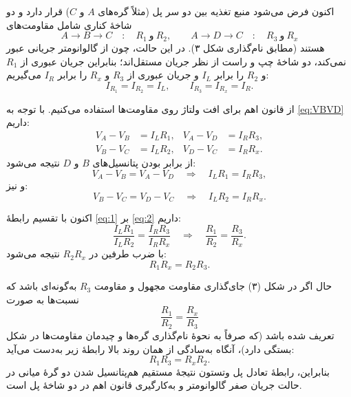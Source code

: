 \documentclass[a4paper, 11pt]{article}
\begin{document}
اکنون فرض می‌شود منبع تغذیه بین دو سر پل (مثلاً گره‌های $A$ و $C$) قرار دارد و دو شاخهٔ کناری شامل مقاومت‌های
\[
A \to B \to C \quad : \quad R_1 \ \text{و}\ R_2,
\qquad
A \to D \to C \quad : \quad R_3 \ \text{و}\ R_x
\]
هستند (مطابق نام‌گذاری شکل ۳). در این حالت، چون از گالوانومتر جریانی عبور نمی‌کند، دو شاخهٔ چپ و راست از نظر جریان مستقل‌اند؛ بنابراین جریان عبوری از $R_1$ و $R_2$ را برابر $I_L$ و جریان عبوری از $R_3$ و $R_x$ را برابر $I_R$ می‌گیریم:
\begin{equation}
I_{R_1}=I_{R_2}=I_L,
\qquad
I_{R_3}=I_{R_x}=I_R.
\end{equation}

از قانون اهم برای افت ولتاژ روی مقاومت‌ها استفاده می‌کنیم. با توجه به \eqref{eq:VBVD} داریم:
\begin{align}
V_A - V_B &= I_L R_1,
&
V_A - V_D &= I_R R_3,
\\
V_B - V_C &= I_L R_2,
&
V_D - V_C &= I_R R_x.
\end{align}
از برابر بودن پتانسیل‌های $B$ و $D$ نتیجه می‌شود:
\begin{equation}
V_A - V_B = V_A - V_D
\quad \Longrightarrow \quad
I_L R_1 = I_R R_3,
\label{eq:1}
\end{equation}
و نیز:
\begin{equation}
V_B - V_C = V_D - V_C
\quad \Longrightarrow \quad
I_L R_2 = I_R R_x.
\label{eq:2}
\end{equation}

اکنون با تقسیم رابطهٔ \eqref{eq:1} بر \eqref{eq:2} داریم:
\begin{equation}
\frac{I_L R_1}{I_L R_2} = \frac{I_R R_3}{I_R R_x}
\quad \Longrightarrow \quad
\frac{R_1}{R_2} = \frac{R_3}{R_x}.
\end{equation}
با ضرب طرفین در $R_2 R_x$ نتیجه می‌شود:
\begin{equation}
R_1 R_x = R_2 R_3.
\label{eq:balance}
\end{equation}

حال اگر در شکل (۳) جای‌گذاری مقاومت مجهول و مقاومت $R_3$ به‌گونه‌ای باشد که نسبت‌ها به صورت
\[
\frac{R_1}{R_2}=\frac{R_x}{R_3}
\]
تعریف شده باشد (که صرفاً به نحوهٔ نام‌گذاری گره‌ها و چیدمان مقاومت‌ها در شکل بستگی دارد)، آنگاه به‌سادگی از همان روند بالا رابطهٔ زیر به‌دست می‌آید:
\begin{equation}
R_1 R_3 = R_x R_2.
\end{equation}
بنابراین، رابطهٔ تعادل پل وتستون نتیجهٔ مستقیم هم‌پتانسیل شدن دو گرهٔ میانی در حالت جریان صفر گالوانومتر و به‌کارگیری قانون اهم در دو شاخهٔ پل است.
\end{document}
